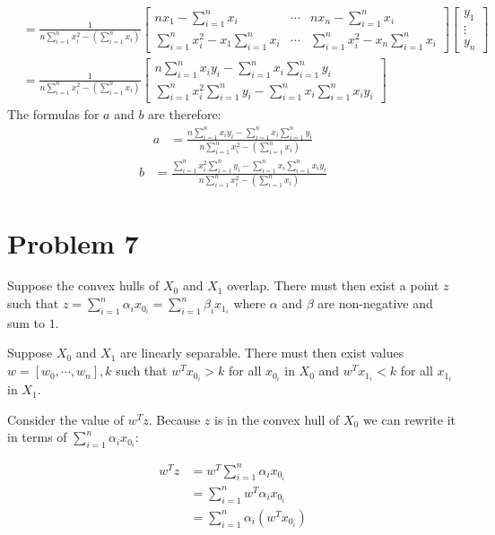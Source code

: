 \documentclass[12pt]{article}
\begin{document}
\begin{align}
&= \frac{1}{n\sum_{i=1}^nx_i^2-\left(\sum_{i=1}^nx_i\right)}
\begin{bmatrix}
	nx_1 - \sum_{i=1}^nx_i & \cdots & nx_n - \sum_{i=1}^nx_i \\
	\sum_{i=1}^nx_i^2 - x_1\sum_{i=1}^nx_i & \cdots & \sum_{i=1}^nx_i^2 - x_n\sum_{i=1}^nx_i
\end{bmatrix}
\begin{bmatrix}
	y_1 \\
	\vdots \\
	y_n
\end{bmatrix} \\
&= \frac{1}{n\sum_{i=1}^nx_i^2-\left(\sum_{i=1}^nx_i\right)}
\begin{bmatrix}
	n\sum_{i=1}^nx_iy_i - \sum_{i=1}^nx_i\sum_{i=1}^ny_i \\
	\sum_{i=1}^nx_i^2\sum_{i=1}^ny_i-\sum_{i=1}^nx_i\sum_{i=1}^nx_iy_i
\end{bmatrix}
\end{align}
The formulas for $a$ and $b$ are therefore:
\begin{align}
a &= \frac{n\sum_{i=1}^nx_iy_i - \sum_{i=1}^nx_i\sum_{i=1}^ny_i}{n\sum_{i=1}^nx_i^2-\left(\sum_{i=1}^nx_i\right)}
\end{align}
\begin{align}
b &= \frac{\sum_{i=1}^nx_i^2\sum_{i=1}^ny_i-\sum_{i=1}^nx_i\sum_{i=1}^nx_iy_i}{n\sum_{i=1}^nx_i^2-\left(\sum_{i=1}^nx_i\right)}
\end{align}

\section*{Problem 7}
	Suppose the convex hulls of $X_0$ and $X_1$ overlap. There must then exist a point $z$ such that $z = \sum_{i=1}^n\alpha_ix_{0_i} = \sum_{i=1}^n\beta_ix_{1_i}$ where $\alpha$ and $\beta$ are non-negative and sum to $1$.
	
	Suppose $X_0$ and $X_1$ are linearly separable. There must then exist values $w=[w_0,\cdots,w_n], k$ such that $w^Tx_{0_i} > k$ for all $x_{0_i}$ in ${X_0}$ and $w^Tx_{1_i} < k$ for all $x_{1_i}$ in $X_1$.

	Consider the value of $w^Tz$. Because $z$ is in the convex hull of $X_0$ we can rewrite it in terms of $\sum_{i=1}^n\alpha_ix_{0_i}$:
	
	\begin{align}
		w^Tz &= w^T\sum_{i=1}^n\alpha_ix_{0_i} \\
		&= \sum_{i=1}^nw^T\alpha_ix_{0_i} \\
		&= \sum_{i=1}^n\alpha_i\left(w^Tx_{0_i}\right)
	\end{align}
	
\end{document}
